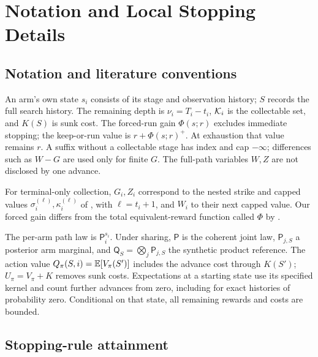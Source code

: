 \section{Notation and Local Stopping Details}
\label{app:proof-details}

\subsection{Notation and literature conventions}
\label{app:notation}

An arm's own state $s_i$ consists of its stage and observation history;
$S$ records the full search history. The remaining depth is $\nu_i=T_i-t_i$,
$\mathcal{K}_i$ is the collectable set, and $K(S)$ is sunk cost. The forced-run gain
$\Phi(s;r)$ excludes immediate stopping; the keep-or-run value is
$r+\Phi(s;r)^+$. At exhaustion that value remains $r$. A suffix without a
collectable stage has index and cap $-\infty$; differences such as $W-G$ are
used only for finite $G$. The full-path variables $W,Z$ are not disclosed by
one advance.

For terminal-only collection, $G_i,Z_i$ correspond to the nested strike and
capped values $\sigma_i^{(\ell)},\kappa_i^{(\ell)}$ of
\citet[Definition~4]{bowers2024nested}, with $\ell=t_i+1$, and $W_i$ to their
next capped value. Our forced gain differs from the total equivalent-reward
function called $\Phi$ by \citet[Definition~3.2]{yang2025markovian}.

The per-arm path law is $\mathsf P_i^{s_i}$. Under sharing, $\mathsf P$ is the
coherent joint law, $\mathsf P_{j,S}$ a posterior arm marginal, and
$\mathsf Q_S=\bigotimes_j\mathsf P_{j,S}$ the synthetic product reference.
The action value $Q_\pi(S,i)=\mathbb{E}[V_\pi(S')]$ includes the advance cost through
$K(S')$; $U_\pi=V_\pi+K$ removes sunk costs. Expectations at a starting state
use its specified kernel and count further advances from zero, including for
exact histories of probability zero. Conditional on that state,
all remaining rewards and costs are bounded.

\subsection{Stopping-rule attainment}

